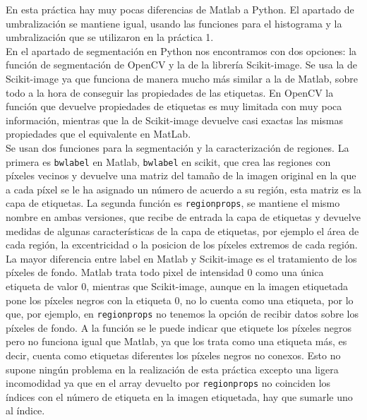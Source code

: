 \documentclass[a4paper,12pt]{report}
\begin{document}
En esta práctica hay muy pocas diferencias de Matlab a Python. El apartado de umbralización se mantiene igual, usando las funciones para el histograma y la umbralización que se utilizaron en la práctica 1.\\

En el apartado de segmentación en Python nos encontramos con dos opciones: la función de segmentación de OpenCV y la de la librería Scikit-image. Se usa la de Scikit-image ya que funciona de manera mucho más similar a la de Matlab, sobre todo a la hora de conseguir las propiedades de las etiquetas. En OpenCV la función que devuelve propiedades de etiquetas es muy limitada con muy poca información, mientras que la de Scikit-image devuelve casi exactas las mismas propiedades que el equivalente en MatLab.\\


 Se usan dos funciones para la segmentación y la caracterización de regiones. La primera es \texttt{bwlabel} en Matlab, \texttt{bwlabel} en scikit,  que crea las regiones con píxeles vecinos y devuelve una matriz del tamaño de la imagen original en la que a cada píxel se le ha asignado un número de acuerdo a su región, esta matriz es la capa de etiquetas. La segunda función es \texttt{regionprops}, se mantiene el mismo nombre en ambas versiones, que recibe de entrada la capa de etiquetas y devuelve medidas de algunas características de la capa de etiquetas, por ejemplo el área de cada región, la excentricidad o la posicion de los píxeles extremos de cada región.\\

La mayor diferencia entre label en Matlab y Scikit-image es el tratamiento de los píxeles de fondo. Matlab trata todo pixel de intensidad 0 como una única etiqueta de valor 0, mientras que Scikit-image, aunque en la imagen etiquetada pone los píxeles negros con la etiqueta 0, no lo cuenta como una etiqueta, por lo que, por ejemplo, en \texttt{regionprops} no tenemos la opción de recibir datos sobre los píxeles de fondo. A la función se le puede indicar que etiquete los píxeles negros pero no funciona igual que Matlab, ya que los trata como una etiqueta más, es decir, cuenta como etiquetas diferentes los píxeles negros no conexos. Esto no supone ningún problema en la realización de esta práctica excepto una ligera incomodidad ya que en el array devuelto por \texttt{regionprops} no coinciden los índices con el número de etiqueta en la imagen etiquetada, hay que sumarle uno al índice.\\
\end{document}
